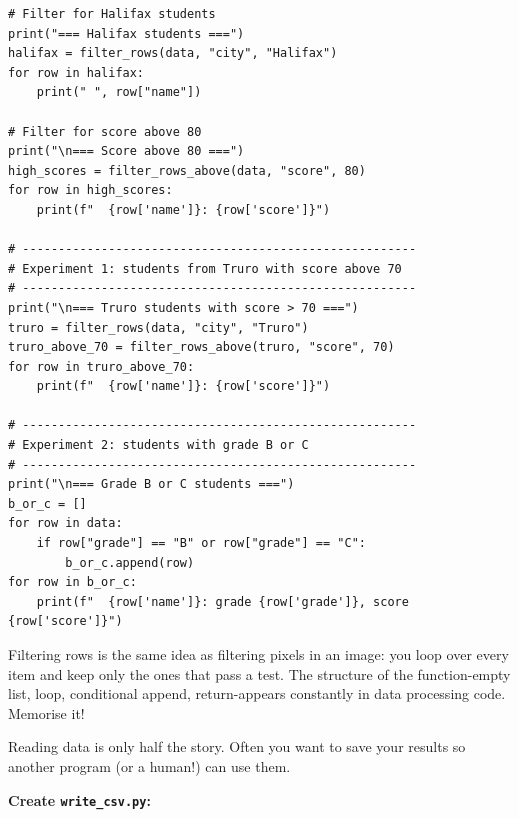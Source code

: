 \documentclass{cslab}
\begin{document}
\begin{lstlisting}
# Filter for Halifax students
print("=== Halifax students ===")
halifax = filter_rows(data, "city", "Halifax")
for row in halifax:
    print(" ", row["name"])

# Filter for score above 80
print("\n=== Score above 80 ===")
high_scores = filter_rows_above(data, "score", 80)
for row in high_scores:
    print(f"  {row['name']}: {row['score']}")

# -------------------------------------------------------
# Experiment 1: students from Truro with score above 70
# -------------------------------------------------------
print("\n=== Truro students with score > 70 ===")
truro = filter_rows(data, "city", "Truro")
truro_above_70 = filter_rows_above(truro, "score", 70)
for row in truro_above_70:
    print(f"  {row['name']}: {row['score']}")

# -------------------------------------------------------
# Experiment 2: students with grade B or C
# -------------------------------------------------------
print("\n=== Grade B or C students ===")
b_or_c = []
for row in data:
    if row["grade"] == "B" or row["grade"] == "C":
        b_or_c.append(row)
for row in b_or_c:
    print(f"  {row['name']}: grade {row['grade']}, score {row['score']}")
\end{lstlisting}

\begin{note}
Filtering rows is the same idea as filtering pixels in an image: you loop over every item and keep only the ones that pass a test. The structure of the function-empty list, loop, conditional append, return-appears constantly in data processing code. Memorise it!
\end{note}


Reading data is only half the story. Often you want to save your results so another program (or a human!) can use them.

\textbf{Create \texttt{write\_csv.py}:}
\end{document}
